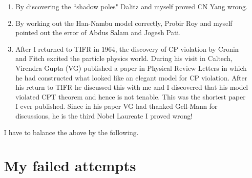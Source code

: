 \begin{enumerate}
\item By discovering the ``shadow poles" Dalitz and myself proved CN Yang 
wrong.

\item By working out the Han-Nambu model correctly, Probir Roy and myself 
pointed out the error of Abdus Salam and Jogesh Pati.

\item After I returned to TIFR in 1964, the discovery of CP violation by 
Cronin and Fitch excited the particle physics world. During his visit in 
Caltech, Virendra Gupta (VG) published a paper in Physical Review 
Letters in which he had constructed what looked like an elegant model 
for CP violation. After his return to TIFR he discussed this with me and 
I discovered that his model violated CPT theorem and hence is not 
tenable. This was the shortest paper I ever published. Since in his 
paper VG had thanked Gell-Mann for discussions, he is the third Nobel 
Laureate I proved wrong!
\end{enumerate}

I have to balance the above by the following.

\section*{My failed attempts}

